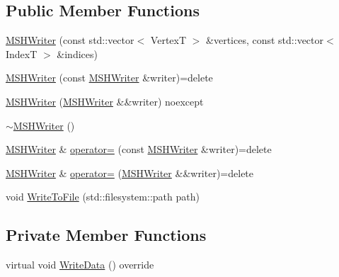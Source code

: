 \subsection*{Public Member Functions}
\begin{DoxyCompactItemize}
\item 
\mbox{\hyperlink{classmage_1_1rendering_1_1loader_1_1_m_s_h_writer_a5e1a7ed8ca94f157f52bba929cac2fd3}{M\+S\+H\+Writer}} (const std\+::vector$<$ VertexT $>$ \&vertices, const std\+::vector$<$ IndexT $>$ \&indices)
\item 
\mbox{\hyperlink{classmage_1_1rendering_1_1loader_1_1_m_s_h_writer_ade94bfa4dc8b4bdc2249cd882f2240e4}{M\+S\+H\+Writer}} (const \mbox{\hyperlink{classmage_1_1rendering_1_1loader_1_1_m_s_h_writer}{M\+S\+H\+Writer}} \&writer)=delete
\item 
\mbox{\hyperlink{classmage_1_1rendering_1_1loader_1_1_m_s_h_writer_a877a042ef1a4472c9d1cece846b2a70a}{M\+S\+H\+Writer}} (\mbox{\hyperlink{classmage_1_1rendering_1_1loader_1_1_m_s_h_writer}{M\+S\+H\+Writer}} \&\&writer) noexcept
\item 
\mbox{\hyperlink{classmage_1_1rendering_1_1loader_1_1_m_s_h_writer_ae2ead8892a1818c59d55a7a5ecdf50b3}{$\sim$\+M\+S\+H\+Writer}} ()
\item 
\mbox{\hyperlink{classmage_1_1rendering_1_1loader_1_1_m_s_h_writer}{M\+S\+H\+Writer}} \& \mbox{\hyperlink{classmage_1_1rendering_1_1loader_1_1_m_s_h_writer_a661eaab96539a7bf08f100095603af0e}{operator=}} (const \mbox{\hyperlink{classmage_1_1rendering_1_1loader_1_1_m_s_h_writer}{M\+S\+H\+Writer}} \&writer)=delete
\item 
\mbox{\hyperlink{classmage_1_1rendering_1_1loader_1_1_m_s_h_writer}{M\+S\+H\+Writer}} \& \mbox{\hyperlink{classmage_1_1rendering_1_1loader_1_1_m_s_h_writer_a98bdde59fa1a7a6398453f0c7bc4e8dd}{operator=}} (\mbox{\hyperlink{classmage_1_1rendering_1_1loader_1_1_m_s_h_writer}{M\+S\+H\+Writer}} \&\&writer)=delete
\item 
void \mbox{\hyperlink{classmage_1_1rendering_1_1loader_1_1_m_s_h_writer_a6ce9780687a45a6c6f98e0843190b63b}{Write\+To\+File}} (std\+::filesystem\+::path path)
\end{DoxyCompactItemize}
\subsection*{Private Member Functions}
\begin{DoxyCompactItemize}
\item 
virtual void \mbox{\hyperlink{classmage_1_1rendering_1_1loader_1_1_m_s_h_writer_ad61ee7097e1bfb52ca9a0697d2cd6a7e}{Write\+Data}} () override
\end{DoxyCompactItemize}
